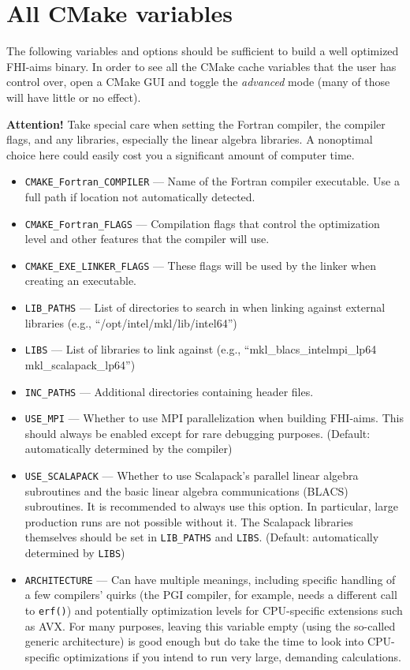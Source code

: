 \section{\label{sec:CMake_variables}All CMake variables}

The following variables and options should be sufficient to build a well optimized FHI-aims binary. In order to see all the CMake cache variables that the user has control over, open a CMake GUI and toggle the \textit{advanced} mode (many of those will have little or no effect).

\textbf{Attention!} Take special care when setting the Fortran compiler, the compiler flags, and any libraries, especially the linear algebra libraries. A nonoptimal choice here could easily cost you a significant amount of computer time.

\begin{itemize}
\item \texttt{CMAKE\_Fortran\_COMPILER} --- Name of the Fortran compiler executable. Use a full path if location not automatically detected.
\item \texttt{CMAKE\_Fortran\_FLAGS} ---  Compilation flags that control the optimization level and other features that the compiler will use.
\item \texttt{CMAKE\_EXE\_LINKER\_FLAGS} --- These flags will be used by the linker when creating an executable.
\item \texttt{LIB\_PATHS} --- List of directories to search in when linking against external libraries (e.g., ``/opt/intel/mkl/lib/intel64'')
\item \texttt{LIBS} --- List of libraries to link against (e.g., ``mkl\_blacs\_intelmpi\_lp64 mkl\_scalapack\_lp64'')
\item \texttt{INC\_PATHS} --- Additional directories containing header files.
\item \texttt{USE\_MPI} ---  Whether to use MPI parallelization when building FHI-aims. This should always be enabled except for rare debugging purposes. (Default: automatically determined by the compiler)
\item \texttt{USE\_SCALAPACK} --- Whether to use Scalapack's parallel linear algebra subroutines and the basic linear algebra communications (BLACS) subroutines. It is recommended to always use this option. In particular, large production runs are not possible without it. The Scalapack libraries themselves should be set in \texttt{LIB\_PATHS} and \texttt{LIBS}. (Default: automatically determined by \texttt{LIBS})
\item \texttt{ARCHITECTURE} --- Can have multiple meanings, including specific handling of a few compilers' quirks (the PGI compiler, for example, needs a different call to \texttt{erf()}) and potentially optimization levels for CPU-specific extensions such as AVX. For many purposes, leaving this variable empty (using the so-called generic architecture) is good enough but do take the time to look into CPU-specific optimizations if you intend to run very large, demanding calculations.

\end{itemize}
